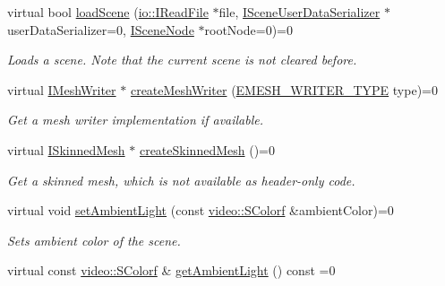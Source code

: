 \begin{DoxyCompactItemize}
virtual bool \hyperlink{classirr_1_1scene_1_1ISceneManager_a21549d3cae3526313c37d9ed7fd08767}{load\+Scene} (\hyperlink{classirr_1_1io_1_1IReadFile}{io\+::\+I\+Read\+File} $\ast$file, \hyperlink{classirr_1_1scene_1_1ISceneUserDataSerializer}{I\+Scene\+User\+Data\+Serializer} $\ast$user\+Data\+Serializer=0, \hyperlink{classirr_1_1scene_1_1ISceneNode}{I\+Scene\+Node} $\ast$root\+Node=0)=0
\begin{DoxyCompactList}\small\item\em Loads a scene. Note that the current scene is not cleared before. \end{DoxyCompactList}\item 
virtual \hyperlink{classirr_1_1scene_1_1IMeshWriter}{I\+Mesh\+Writer} $\ast$ \hyperlink{classirr_1_1scene_1_1ISceneManager_ae9a06fb68757381f99cfe11ecbd153e6}{create\+Mesh\+Writer} (\hyperlink{namespaceirr_1_1scene_a431fa15741518ba15f6d5f2608b6cb4e}{E\+M\+E\+S\+H\+\_\+\+W\+R\+I\+T\+E\+R\+\_\+\+T\+Y\+PE} type)=0
\begin{DoxyCompactList}\small\item\em Get a mesh writer implementation if available. \end{DoxyCompactList}\item 
virtual \hyperlink{classirr_1_1scene_1_1ISkinnedMesh}{I\+Skinned\+Mesh} $\ast$ \hyperlink{classirr_1_1scene_1_1ISceneManager_a67015b46ffde252ba723e6dcc6a93ac2}{create\+Skinned\+Mesh} ()=0
\begin{DoxyCompactList}\small\item\em Get a skinned mesh, which is not available as header-\/only code. \end{DoxyCompactList}\item 
\mbox{\label{classirr_1_1scene_1_1ISceneManager_a8a424accb615c4f60fde59f55033a816}} 
virtual void \hyperlink{classirr_1_1scene_1_1ISceneManager_a8a424accb615c4f60fde59f55033a816}{set\+Ambient\+Light} (const \hyperlink{classirr_1_1video_1_1SColorf}{video\+::\+S\+Colorf} \&ambient\+Color)=0
\begin{DoxyCompactList}\small\item\em Sets ambient color of the scene. \end{DoxyCompactList}\item 
\mbox{\label{classirr_1_1scene_1_1ISceneManager_a9da2090baaeeaa6261d6a1fac5025b09}} 
virtual const \hyperlink{classirr_1_1video_1_1SColorf}{video\+::\+S\+Colorf} \& \hyperlink{classirr_1_1scene_1_1ISceneManager_a9da2090baaeeaa6261d6a1fac5025b09}{get\+Ambient\+Light} () const =0

\end{DoxyCompactItemize}
